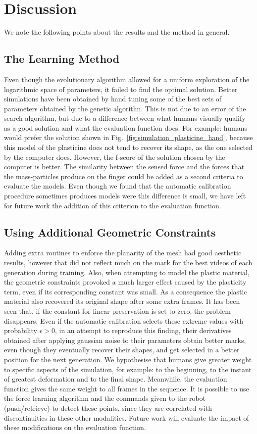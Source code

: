 \documentclass[journal]{IEEEtran}
\newcommand{\fref}[1]{Fig.~\ref{#1}}
\newcounter{algorithm}
\begin{document}
\section{Discussion}
\label{sec:discussion}
We note the following points about the results and the method in general.
\subsection{The Learning Method}
Even though the evolutionary algorithm allowed for a uniform exploration of the logarithmic space of parameters, it failed to find the optimal solution.  Better simulations have been obtained by hand tuning some of the best sets of parameters obtained by the genetic algorithn.  This is not due to an error of the search algorithm, but due to a difference between what humans visually qualify as a good solution and what the evaluation function does.  For example: humans would prefer the solution shown in \fref{fig:simulation_plasticine_hand}, because this model of the plasticine does not tend to recover its shape, as the one selected by the computer does.  However, the f-score of the solution chosen by the computer is better.  The similarity between the sensed force and the forces that the mass-particles produce on the finger could be added as a second criteria to evaluate the models.  Even though we found that the automatic calibration procedure sometimes produces models were this difference is small, we have left for future work the addition of this criterion to the evaluation function.

\subsection{Using Additional Geometric Constraints}
Adding extra routines to enforce the planarity of the mesh had good aesthetic results, however that did not reflect much on the mark for the best videos of each generation during training.   Also, when attempting to model the plastic material, the geometric constraints provoked a much larger effect caused by the plasticity term, even if its corresponding constant was small.  As a consequence the plastic material also recovered its original shape after some extra frames.  It has been seen that, if the constant for linear preservation is set to zero, the problem disappears.  Even if the automatic calibration selects these extreme values with probability $\epsilon>0$, in an attempt to reproduce this finding, their derivatives obtained after applying gaussian noise to their parameters obtain better marks, even though they eventually recover their shapes, and get selected in a better position for the next generation.  We hypothesise that humans give greater weight to specific aspects of the simulation, for example: to the beginning, to the instant of greatest deformation and to the final shape.  Meanwhile, the evaluation function gives the same weight to all frames in the sequence.  It is possible to use the force learning algorithm and the commands given to the robot (push/retrieve) to detect these points, since they are correlated with discontinuities in these other modalities.  Future work will evaluate the impact of these modifications on the evaluation function.
\end{document}
